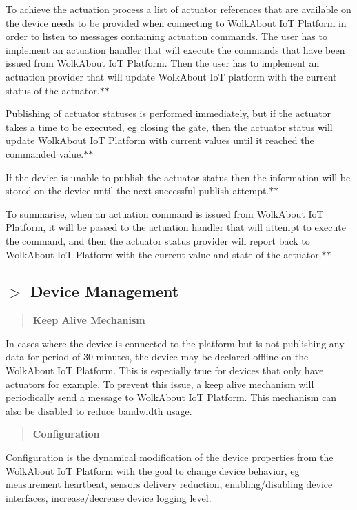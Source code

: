 To achieve the actuation process a list of actuator references that are available on the device needs to be provided when connecting to Wolk\+About IoT Platform in order to listen to messages containing actuation commands. The user has to implement an actuation handler that will execute the commands that have been issued from Wolk\+About IoT Platform. Then the user has to implement an actuation provider that will update Wolk\+About IoT platform with the current status of the actuator.$\ast$$\ast$

Publishing of actuator statuses is performed immediately, but if the actuator takes a time to be executed, eg closing the gate, then the actuator status will update Wolk\+About IoT Platform with current values until it reached the commanded value.$\ast$$\ast$

If the device is unable to publish the actuator status then the information will be stored on the device until the next successful publish attempt.$\ast$$\ast$

To summarise, when an actuation command is issued from Wolk\+About IoT Platform, it will be passed to the actuation handler that will attempt to execute the command, and then the actuator status provider will report back to Wolk\+About IoT Platform with the current value and state of the actuator.$\ast$$\ast$

\subsection*{$>$ Device Management}

\label{_keep-alive-mechanism}%
 \begin{quote}
{\bfseries Keep Alive Mechanism} \end{quote}
In cases where the device is connected to the platform but is not publishing any data for period of 30 minutes, the device may be declared offline on the Wolk\+About IoT Platform. This is especially true for devices that only have actuators for example. To prevent this issue, a keep alive mechanism will periodically send a message to Wolk\+About IoT Platform. This mechanism can also be disabled to reduce bandwidth usage.

\label{_configuration}%
 \begin{quote}
{\bfseries Configuration} \end{quote}
Configuration is the dynamical modification of the device properties from the Wolk\+About IoT Platform with the goal to change device behavior, eg measurement heartbeat, sensors delivery reduction, enabling/disabling device interfaces, increase/decrease device logging level.

